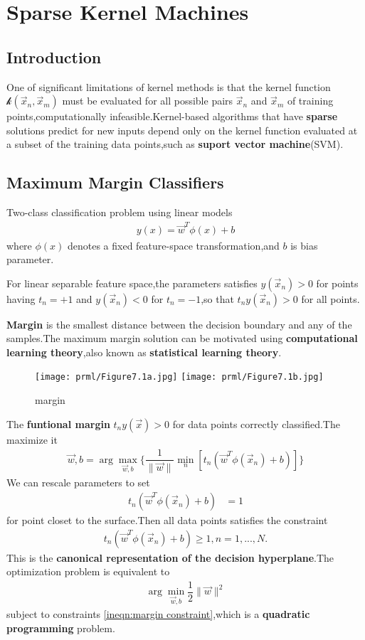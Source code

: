 \chapter{Sparse Kernel Machines}
\label{chap:Sparse Kernel Machines}
\section{Introduction}
One of significant limitations of kernel methods is that the kernel function $\mathcal{k}(\vec{x}_n,\vec{x}_m)$ must be evaluated for all possible pairs $\vec{x}_n$ and $\vec{x}_m$ of training points,computationally infeasible.Kernel-based algorithms that have \textbf{sparse} solutions predict for new inputs depend only on the kernel function evaluated at a subset of the training data points,such as \textbf{suport vector machine}(SVM).
\section{Maximum Margin Classifiers}
Two-class classification problem using linear models
\begin{align}
y(x) = \vec{w}^T\phi(x)+b
\end{align}
where $\phi(x)$ denotes a fixed feature-space transformation,and $b$ is bias parameter.

For linear separable feature space,the parameters satisfies $y(\vec{x}_n)>0$ for points having $t_n=+1$ and $y(\vec{x}_n)<0$ for $t_n=-1$,so that $t_ny(\vec{x}_n)>0$ for all points.

\textbf{Margin} is the smallest distance between the decision boundary and any of the samples.The maximum margin solution can be motivated using \textbf{computational learning theory},also known as \textbf{statistical learning theory}.
\begin{figure*}

	\texttt{[image: prml/Figure7.1a.jpg]}
	\texttt{[image: prml/Figure7.1b.jpg]}
	\caption{margin}
\end{figure*}

The \textbf{funtional margin} $t_ny(\vec{x}) > 0$ for data points correctly classified.The maximize it
\begin{align}
\vec{w},b = \arg\max\limits_{\vec{w},b}\{\dfrac{1}{\parallel\vec{w}\parallel}\min_n
[t_n(\vec{w}^T\phi(\vec{x}_n)+b)] \}
\end{align}
We can rescale parameters to set
\begin{align}
t_n(\vec{w}^T\phi(\vec{x}_n)+b) &= 1
\end{align}
for point closet to the surface.Then all data points satisfies the constraint
\begin{align}\label{ineqn:margin constraint}
t_n(\vec{w}^T\phi(\vec{x}_n)+b) \geq 1,n=1,...,N.
\end{align}
This is the \textbf{canonical representation of the decision hyperplane}.The optimization problem is equivalent to
\begin{align}
\arg\min\limits_{\vec{w},b}\dfrac{1}{2}\parallel\vec{w}\parallel^2
\end{align}
subject to constraints \ref{ineqn:margin constraint},which is a \textbf{quadratic programming} problem.

